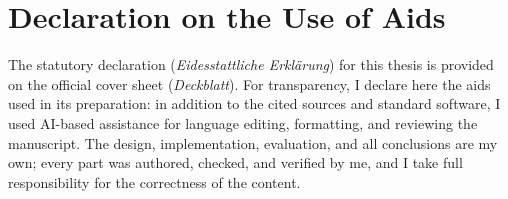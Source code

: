 
\chapter*{Declaration on the Use of Aids}
\thispagestyle{empty}

The statutory declaration (\textit{Eidesstattliche Erklärung}) for this thesis is provided on the official cover sheet (\textit{Deckblatt}). For transparency, I declare here the aids used in its preparation: in addition to the cited sources and standard software, I used AI-based assistance for language editing, formatting, and reviewing the manuscript. The design, implementation, evaluation, and all conclusions are my own; every part was authored, checked, and verified by me, and I take full responsibility for the correctness of the content.
